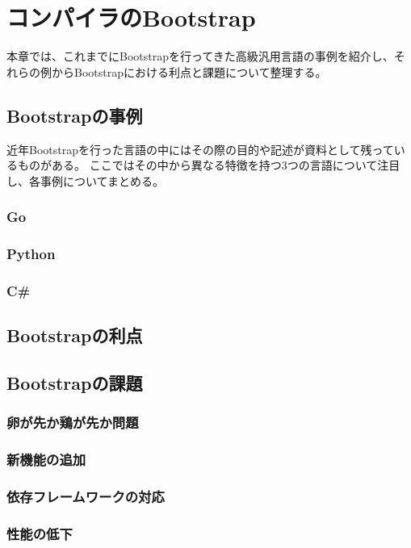 \chapter{コンパイラのBootstrap}
\label{explain-bootstrap}

本章では、これまでにBootstrapを行ってきた高級汎用言語の事例を紹介し、それらの例からBootstrapにおける利点と課題について整理する。

\section{Bootstrapの事例}
\label{explain-bootstrap:instance}

近年Bootstrapを行った言語の中にはその際の目的や記述が資料として残っているものがある。
ここではその中から異なる特徴を持つ3つの言語について注目し、各事例についてまとめる。

\subsection{Go}

\subsection{Python}

\subsection{C\#}

\section{Bootstrapの利点}
\label{explain-bootstrap:merit}

\section{Bootstrapの課題}
\label{explain-bootstrap:issue}

\subsection{卵が先か鶏が先か問題}

\subsection{新機能の追加}

\subsection{依存フレームワークの対応}

\subsection{性能の低下}


